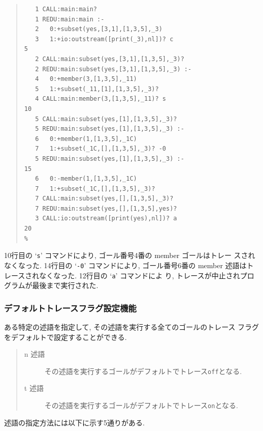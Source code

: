 \documentclass[a4,titlepage]{jsreport}
\begin{document}
\begin{quote}%
\begin{Verbatim}[frame=single,baselinestretch=0.8]
% subset -t                                                          1
   1 CALL:main:main? 
   1 REDU:main:main :-
   2   0:+subset(yes,[3,1],[1,3,5],_3)
   3   1:+io:outstream([print(_3),nl])? c                            5
   2 CALL:main:subset(yes,[3,1],[1,3,5],_3)? 
   2 REDU:main:subset(yes,[3,1],[1,3,5],_3) :-
   4   0:+member(3,[1,3,5],_11)
   5   1:+subset(_11,[1],[1,3,5],_3)? 
   4 CALL:main:member(3,[1,3,5],_11)? s                             10
   5 CALL:main:subset(yes,[1],[1,3,5],_3)? 
   5 REDU:main:subset(yes,[1],[1,3,5],_3) :-
   6   0:+member(1,[1,3,5],_1C)
   7   1:+subset(_1C,[],[1,3,5],_3)? -0
   5 REDU:main:subset(yes,[1],[1,3,5],_3) :-                        15
   6   0:-member(1,[1,3,5],_1C)
   7   1:+subset(_1C,[],[1,3,5],_3)? 
   7 CALL:main:subset(yes,[],[1,3,5],_3)? 
   7 REDU:main:subset(yes,[],[1,3,5],yes)? 
   3 CALL:io:outstream([print(yes),nl])? a                          20
% 
\end{Verbatim}
\end{quote}

10行目の `{\tt s}' コマンドにより, ゴール番号4番の member ゴールはトレー
スされなくなった.  14行目の `{\tt -0}' コマンドにより, ゴール番号6番の 
member 述語はトレースされなくなった.  12行目の `{\tt a}' コマンドによ
り, トレースが中止されプログラムが最後まで実行された.

\subsubsection{デフォルトトレースフラグ設定機能}

ある特定の述語を指定して, その述語を実行する全てのゴールのトレース
フラグをデフォルトで設定することができる.  

\begin{quote}
\begin{description}
\item[n 述語] その述語を実行するゴールがデフォルトでトレース{\tt off}となる.  
\item[t 述語] その述語を実行するゴールがデフォルトでトレース{\tt on}となる.  
\end{description}
\end{quote}

述語の指定方法には以下に示す5通りがある.  
\end{document}
